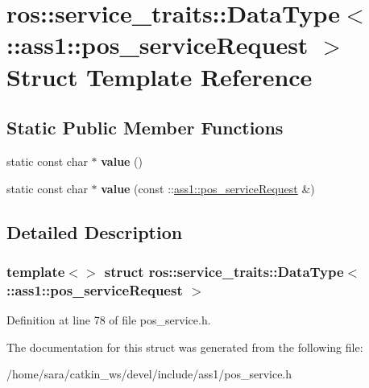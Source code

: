 \hypertarget{structros_1_1service__traits_1_1DataType_3_01_1_1ass1_1_1pos__serviceRequest_01_4}{}\section{ros\+:\+:service\+\_\+traits\+:\+:Data\+Type$<$ \+:\+:ass1\+:\+:pos\+\_\+service\+Request $>$ Struct Template Reference}
\label{structros_1_1service__traits_1_1DataType_3_01_1_1ass1_1_1pos__serviceRequest_01_4}
\subsection*{Static Public Member Functions}
\begin{DoxyCompactItemize}
\item 
\mbox{\label{structros_1_1service__traits_1_1DataType_3_01_1_1ass1_1_1pos__serviceRequest_01_4_a0f7d8e6a69b5b985ed6acbd6bfa294b5}} 
static const char $\ast$ {\bfseries value} ()
\item 
\mbox{\label{structros_1_1service__traits_1_1DataType_3_01_1_1ass1_1_1pos__serviceRequest_01_4_aebf682ffd90b474d628c30249ac5a515}} 
static const char $\ast$ {\bfseries value} (const \+::\hyperlink{structass1_1_1pos__serviceRequest__}{ass1\+::pos\+\_\+service\+Request} \&)
\end{DoxyCompactItemize}


\subsection{Detailed Description}
\subsubsection*{template$<$$>$\newline
struct ros\+::service\+\_\+traits\+::\+Data\+Type$<$ \+::ass1\+::pos\+\_\+service\+Request $>$}



Definition at line 78 of file pos\+\_\+service.\+h.



The documentation for this struct was generated from the following file\+:\begin{DoxyCompactItemize}
\item 
/home/sara/catkin\+\_\+ws/devel/include/ass1/pos\+\_\+service.\+h\end{DoxyCompactItemize}

